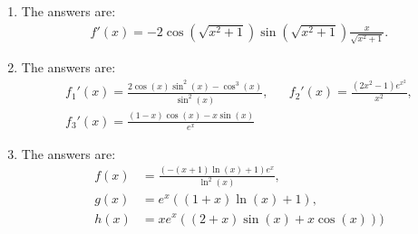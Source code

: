 \begin{enumerate}
	\item The answers are:
	\begin{align*}
	f'(x)=-2\cos(\sqrt{x^2+1})\sin(\sqrt{x^2+1})\frac{x}{\sqrt{x^2+1}}.
	\end{align*}
		
	\item The answers are:
	\begin{align*}
	f_1'(x)=\frac{2\cos(x)\sin^2(x)-\cos^3(x)}{\sin^2(x)},&&f_2'(x)=\frac{(2x^2-1)e^{x^2}}{x^2},\\f_3'(x)= \frac{(1-x)\cos(x)-x\sin(x)}{e^{x}}
	\end{align*}
	
	
	
	\item The answers are:
	\begin{align*}
	f(x)&=\frac{(-(x+1)\ln(x)+1)e^x}{\ln^2(x)},\\ g(x)&=e^x((1+x)\ln (x)+1),\\ h(x)&=xe^x((2+x)\sin(x)+x\cos(x)) )
	\end{align*}
	
	
\end{enumerate}